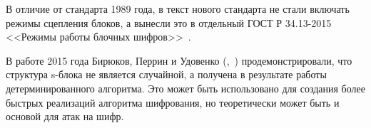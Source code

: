 В отличие от стандарта 1989 года, в текст нового стандарта не стали включать режимы сцепления блоков, а вынесли это в отдельный ГОСТ Р 34.13-2015 <<Режимы работы блочных шифров>>~\cite{GOST-R:34.13-2015}.

В работе 2015 года Бирюков, Перрин и Удовенко (,~\cite{Biryukov:Perrin:Udovenko:2015}) продемонстрировали, что структура s-блока не является случайной, а получена в результате работы детерминированного алгоритма. Это может быть использовано для создания более быстрых реализаций алгоритма шифрования, но теоретически может быть и основой для атак на шифр.

